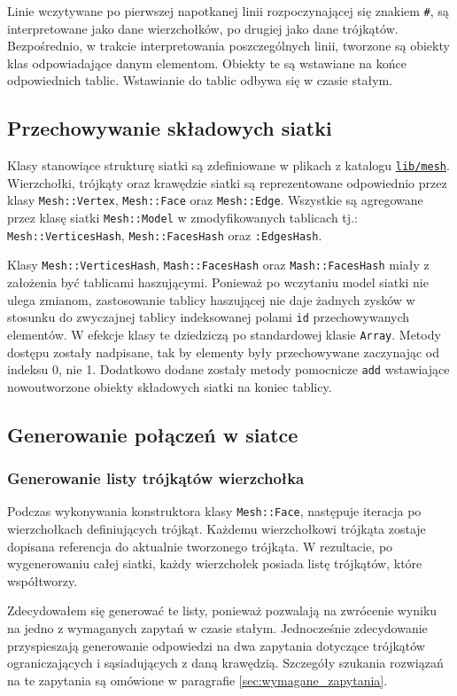 \documentclass[10pt,a4paper]{article}
\newcommand{\f}[1]{\texttt{#1}}
\newcommand{\rev}{754330aa66a33e7434e6bda5c083aa3e12b7b65f}
\newcommand{\revhref}[1] {\href{https://github.com/student-tomasz/aisd-projekt-indywidualny/blob/\rev/#1}{\f{#1}}}
\begin{document}
Linie wczytywane po pierwszej napotkanej linii rozpoczynającej się znakiem
\f{\#}, są interpretowane jako dane wierzchołków, po drugiej jako dane
trójkątów. Bezpośrednio, w trakcie interpretowania poszczególnych linii,
tworzone są obiekty klas odpowiadające danym elementom. Obiekty te są
wstawiane na końce odpowiednich tablic. Wstawianie do tablic odbywa się w
czasie stałym.


\subsection{Przechowywanie składowych siatki}

Klasy stanowiące strukturę siatki są zdefiniowane w plikach z katalogu
\revhref{lib/mesh}. Wierzchołki, trójkąty oraz krawędzie siatki są
reprezentowane odpowiednio przez klasy \f{Mesh::Vertex}, \f{Mesh::Face} oraz
\f{Mesh::Edge}. Wszystkie są agregowane przez klasę siatki \f{Mesh::Model} w
zmodyfikowanych tablicach tj.: \f{Mesh::VerticesHash}, \f{Mesh::FacesHash}
oraz \f{:EdgesHash}.

Klasy \f{Mesh::VerticesHash}, \f{Mash::FacesHash} oraz \f{Mash::FacesHash}
miały z założenia być tablicami haszującymi. Ponieważ po wczytaniu model
siatki nie ulega zmianom, zastosowanie tablicy haszującej nie daje żadnych
zysków w stosunku do zwyczajnej tablicy indeksowanej polami \f{id}
przechowywanych elementów. W efekcje klasy te dziedziczą po standardowej
klasie \f{Array}. Metody dostępu zostały nadpisane, tak by elementy były
przechowywane zaczynając od indeksu 0, nie 1. Dodatkowo dodane zostały metody
pomocnicze \f{add} wstawiające nowoutworzone obiekty składowych siatki na
koniec tablicy.


\subsection{Generowanie połączeń w siatce}

\subsubsection{Generowanie listy trójkątów wierzchołka}

Podczas wykonywania konstruktora klasy \f{Mesh::Face}, następuje iteracja po
wierzchołkach definiujących trójkąt. Każdemu wierzchołkowi trójkąta zostaje
dopisana referencja do aktualnie tworzonego trójkąta. W rezultacie, po
wygenerowaniu całej siatki, każdy wierzchołek posiada listę trójkątów, które
współtworzy.

Zdecydowałem się generować te listy, ponieważ pozwalają na zwrócenie wyniku na
jedno z wymaganych zapytań w czasie stałym. Jednocześnie zdecydowanie
przyspieszają generowanie odpowiedzi na dwa zapytania dotyczące trójkątów
ograniczających i sąsiadujących z daną krawędzią. Szczegóły szukania rozwiązań
na te zapytania są omówione w paragrafie \ref{sec:wymagane_zapytania}.
\end{document}
